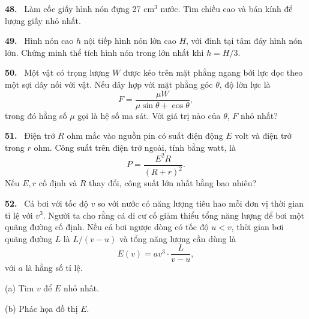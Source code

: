 \documentclass[12pt,a4paper]{article}
\newcommand{\bt}[1]{\par\smallskip\Needspace{5\baselineskip}\noindent\textbf{#1.}\ }
\begin{document}
\bt{48} Làm cốc giấy hình nón đựng 27 cm$^3$ nước. Tìm chiều cao và bán kính để lượng giấy nhỏ nhất.
\bt{49} Hình nón cao $h$ nội tiếp hình nón lớn cao $H$, với đỉnh tại tâm đáy hình nón lớn. Chứng minh thể tích hình nón trong lớn nhất khi $h=H/3$.
\bt{50} Một vật có trọng lượng $W$ được kéo trên mặt phẳng ngang bởi lực dọc theo một sợi dây nối với vật. Nếu dây hợp với mặt phẳng góc $\theta$, độ lớn lực là
\[F=\frac{\mu W}{\mu\sin\theta+\cos\theta},\]
trong đó hằng số $\mu$ gọi là hệ số ma sát. Với giá trị nào của $\theta$, $F$ nhỏ nhất?
\bt{51} Điện trở $R$ ohm mắc vào nguồn pin có suất điện động $E$ volt và điện trở trong $r$ ohm. Công suất trên điện trở ngoài, tính bằng watt, là
\[P=\frac{E^2R}{(R+r)^2}.\]
Nếu $E,r$ cố định và $R$ thay đổi, công suất lớn nhất bằng bao nhiêu?
\bt{52} Cá bơi với tốc độ $v$ so với nước có năng lượng tiêu hao mỗi đơn vị thời gian tỉ lệ với $v^3$. Người ta cho rằng cá di cư cố giảm thiểu tổng năng lượng để bơi một quãng đường cố định. Nếu cá bơi ngược dòng có tốc độ $u<v$, thời gian bơi quãng đường $L$ là $L/(v-u)$ và tổng năng lượng cần dùng là
\[E(v)=av^3\cdot\frac L{v-u},\]
với $a$ là hằng số tỉ lệ.

(a) Tìm $v$ để $E$ nhỏ nhất.

(b) Phác họa đồ thị $E$.
\end{document}
